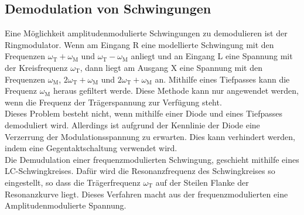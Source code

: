 \subsection{Demodulation von Schwingungen}
Eine Möglichkeit amplitudenmodulierte Schwingungen zu demodulieren ist der Ringmodulator.
Wenn am Eingang R eine modellierte Schwingung mit den Frequenzen $\omega_\text{T}+\omega_\text{M} $ und $\omega_\text{T}-\omega_\text{M}$ anliegt und an Eingang L eine Spannung mit der Kreisfrequenz $\omega_\text{T}$, dann liegt am Ausgang X eine Spannung mit den Frequenzen $\omega_\text{M}$, $2\omega_\text{T}+\omega_\text{M} $ und $2\omega_\text{T}+\omega_\text{M} $ an.
Mithilfe eines Tiefpasses kann die Frequenz $\omega_\text{M}$ heraus gefiltert werde. Diese Methode kann nur angewendet werden, wenn die Frequenz der Trägerspannung zur Verfügung steht.\\
Dieses Problem besteht nicht, wenn mithilfe einer Diode und eines Tiefpasses demoduliert wird.
Allerdings ist aufgrund der Kennlinie der Diode eine Verzerrung der Modulationsspannung zu erwarten.
Dies kann verhindert werden, indem eine Gegentaktschaltung verwendet wird.\\
Die Demudulation einer frequenzmodulierten Schwingung, geschieht mithilfe eines LC-Schwingkreises. Dafür wird die Resonanzfrequenz des Schwingkreises so eingestellt, so dass die Trägerfrequenz $\omega_\text{T}$ auf der Steilen Flanke der Resonanzkurve liegt. Dieses Verfahren macht aus der frequenzmodulierten eine Amplitudenmodulierte Spannung.
\newpage